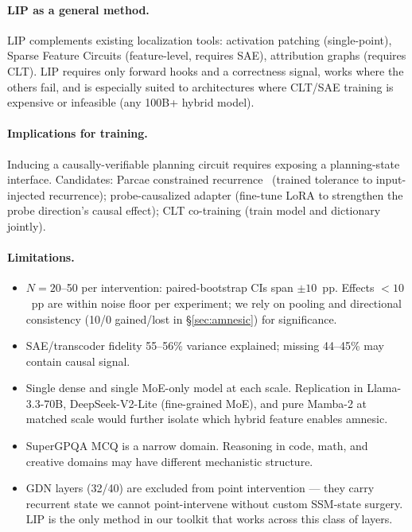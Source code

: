 \documentclass[11pt]{article}
\begin{document}
\paragraph{LIP as a general method.} LIP complements existing localization tools: activation patching (single-point), Sparse Feature Circuits (feature-level, requires SAE), attribution graphs (requires CLT). LIP requires only forward hooks and a correctness signal, works where the others fail, and is especially suited to architectures where CLT/SAE training is expensive or infeasible (any 100B+ hybrid model).

\paragraph{Implications for training.} Inducing a causally-verifiable planning circuit requires exposing a planning-state interface. Candidates: Parcae constrained recurrence~\cite{prairie2026parcae} (trained tolerance to input-injected recurrence); probe-causalized adapter (fine-tune LoRA to strengthen the probe direction's causal effect); CLT co-training (train model and dictionary jointly).

\paragraph{Limitations.}
\begin{itemize}[leftmargin=*, topsep=0pt]
  \item $N=20$--50 per intervention: paired-bootstrap CIs span $\pm 10$~pp. Effects $<10$~pp are within noise floor per experiment; we rely on pooling and directional consistency (10/0 gained/lost in \S\ref{sec:amnesic}) for significance.
  \item SAE/transcoder fidelity 55--56\% variance explained; missing 44--45\% may contain causal signal.
  \item Single dense and single MoE-only model at each scale. Replication in Llama-3.3-70B, DeepSeek-V2-Lite (fine-grained MoE), and pure Mamba-2 at matched scale would further isolate which hybrid feature enables amnesic.
  \item SuperGPQA MCQ is a narrow domain. Reasoning in code, math, and creative domains may have different mechanistic structure.
  \item GDN layers (32/40) are excluded from point intervention --- they carry recurrent state we cannot point-intervene without custom SSM-state surgery. LIP is the only method in our toolkit that works across this class of layers.
\end{itemize}
\end{document}
